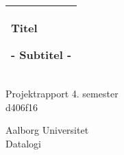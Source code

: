 %
\begin{titlepage}
  \addtolength{\hoffset}{0.5\evensidemargin-0.5\oddsidemargin} %
  \noindent%
  \begin{tabular}{@{}p{\textwidth}@{}}
    \toprule[2pt]
    \midrule
    \vspace{0.2cm}
    \begin{center}
    \Huge{\textbf{
      Titel%
    }}
    \end{center}
    \begin{center}
      \Large{
        - Subtitel - %
      }
    \end{center}
    \vspace{0.2cm}\\
    \midrule
    \toprule[2pt]
  \end{tabular}
  \vspace{4 cm}
  \begin{center}
    {\large
      Projektrapport 4. semester%
    }\\
    \vspace{0.2cm}
    {\Large
      d406f16%
    }
  \end{center}
  \vfill
  \begin{center}
  Aalborg Universitet\\
  Datalogi
  \end{center}
\end{titlepage}
\clearpage
